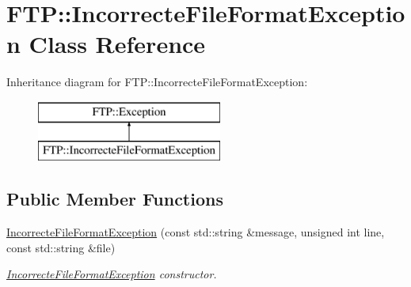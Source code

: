 \hypertarget{class_f_t_p_1_1_incorrecte_file_format_exception}{\section{F\-T\-P\-:\-:Incorrecte\-File\-Format\-Exception Class Reference}
\label{class_f_t_p_1_1_incorrecte_file_format_exception}
}
Inheritance diagram for F\-T\-P\-:\-:Incorrecte\-File\-Format\-Exception\-:\begin{figure}[H]
\begin{center}
\leavevmode
\includegraphics[height=2.000000cm]{class_f_t_p_1_1_incorrecte_file_format_exception}
\end{center}
\end{figure}
\subsection*{Public Member Functions}
\begin{DoxyCompactItemize}
\item 
\hyperlink{class_f_t_p_1_1_incorrecte_file_format_exception_a0ade738f890878daee4f89a1447cb590}{Incorrecte\-File\-Format\-Exception} (const std\-::string \&message, unsigned int line, const std\-::string \&file)
\begin{DoxyCompactList}\small\item\em \hyperlink{class_f_t_p_1_1_incorrecte_file_format_exception}{Incorrecte\-File\-Format\-Exception} constructor. \end{DoxyCompactList}\end{DoxyCompactItemize}


